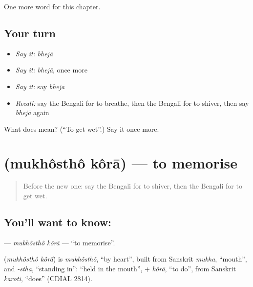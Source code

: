\begin{grammarlens}[title={What you've built}]
One more word for this chapter.
\end{grammarlens}

\subsection*{Your turn}
\begin{itemize}
\raggedright
  \item \emph{Say it:} \emph{bhejā}
  \item \emph{Say it:} \emph{bhejā}, once more
  \item \emph{Say it:} say \emph{bhejā}
  \item \emph{Recall:} say the Bengali for to breathe, then the Bengali for to shiver, then say \emph{bhejā} again
\end{itemize}

\begin{tcolorbox}[breakable,colback=teal!4,colframe=teal!35!black,title={Before you move on}]
What does  mean? (\textquotedblleft{}To get wet\textquotedblright{}.) Say it once more.
\end{tcolorbox}
\section[\texorpdfstring{\bn{মুখস্থ} \bn{করা} (mukhôsthô kôrā)}{মুখস্থ করা (mukhôsthô kôrā)}]{  (mukhôsthô kôrā) — to memorise}

\label{lesson:BN-C181-mukhostho-kora}



\begin{quote}
Before the new one: say the Bengali for to shiver, then the Bengali for to get wet.
\end{quote}

\subsection*{You'll want to know:  }
\textbf{ } — \emph{mukhôsthô kôrā} — \textquotedblleft{}to memorise\textquotedblright{}.

\begin{cousinweb}
\textbf{ } (\emph{mukhôsthô kôrā}) is \emph{mukhôsthô}, \textquotedblleft{}by heart\textquotedblright{}, built from Sanskrit \emph{mukha}, \textquotedblleft{}mouth\textquotedblright{}, and \emph{-stha}, \textquotedblleft{}standing in\textquotedblright{}: \textquotedblleft{}held in the mouth\textquotedblright{}, + \emph{kôrā}, \textquotedblleft{}to do\textquotedblright{}, from Sanskrit \emph{karoti}, \textquotedblleft{}does\textquotedblright{} (CDIAL 2814).
\end{cousinweb}

